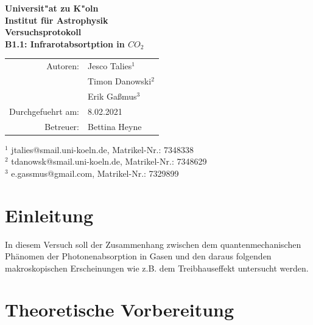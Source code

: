 \documentclass{article}
\begin{document}
\thispagestyle{empty}
\vspace*{\fill}
\begin{center}
	\Huge
	\textbf{Universit"at zu K"oln}\\
	\LARGE
	\textbf{Institut für Astrophysik}\\
	\vspace{2cm}
	\textbf{Versuchsprotokoll}\\
	\vspace{0.5cm}
	\large
	\textbf{B1.1: Infrarotabsortption in $CO_2$}\\
	\normalsize
	\vspace{2cm}
	\begin{tabular}{r l}
		Autoren: 	& Jesco Talies$^1$\\
					& Timon Danowski$^2$\\
                    & Erik Gaßmus$^3$\\
		Durchgefuehrt am:	& 8.02.2021\\
		Betreuer:	& Bettina Heyne
	\end{tabular}
\end{center}
\vfill\footnotesize
$^1$ jtalies@smail.uni-koeln.de, Matrikel-Nr.: 7348338\\
$^2$ tdanowsk@smail.uni-koeln.de, Matrikel-Nr.: 7348629\\
$^3$ e.gassmus@gmail.com, Matrikel-Nr.: 7329899
\normalsize

\newpage
\thispagestyle{empty}
\tableofcontents
\clearpage
\setcounter{page}{1}
\section{Einleitung}
    In diesem Versuch soll der Zusammenhang zwischen dem quantenmechanischen Phänomen der Photonenabsorption
    in Gasen und den daraus folgenden makroskopischen Erscheinungen wie z.B. dem Treibhauseffekt untersucht werden.
\section{Theoretische Vorbereitung}
\end{document}
